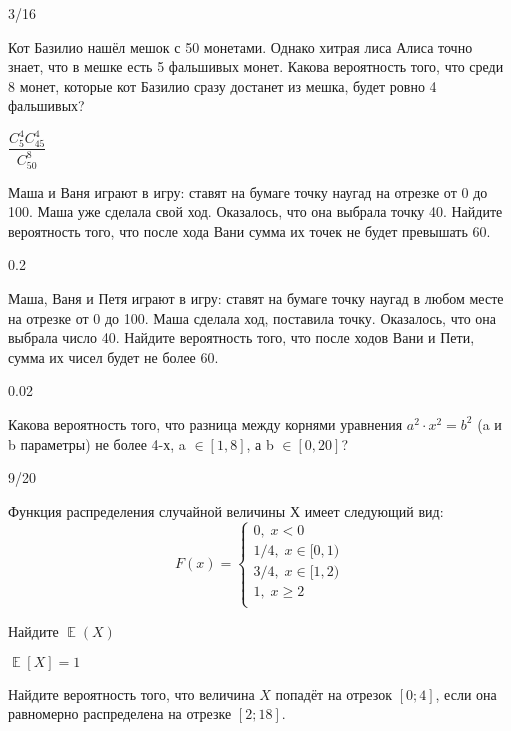 \documentclass[12pt, addpoints, answers]{exam} %
\DeclareMathOperator{\E}{\mathbb{E}}
\begin{document}
\begin{questions}
\begin{solution}
 3/16
\end{solution}

\question Кот Базилио нашёл мешок с 50 монетами. Однако хитрая лиса Алиса точно знает, что в мешке есть 5 фальшивых монет. Какова вероятность того, что среди 8 монет, которые кот Базилио сразу достанет из мешка, будет ровно 4 фальшивых?


\begin{solution}
 $ \dfrac{C_{5}^4C_{45}^4}{C_{50}^8}$
\end{solution}

\question Маша и Ваня играют в игру: ставят на бумаге точку наугад на отрезке от 0 до 100. Маша уже сделала свой ход. Оказалось, что она выбрала точку 40. Найдите вероятность того, что после хода Вани сумма их точек не будет превышать 60.


\begin{solution}
 0.2
\end{solution}

\question Маша, Ваня и Петя играют в игру: ставят на бумаге точку наугад в любом месте на отрезке от 0 до 100. Маша сделала ход, поставила точку. Оказалось, что она выбрала число 40. Найдите вероятность того, что после ходов Вани и Пети, сумма их чисел будет не более 60.

\begin{solution}
 0.02
\end{solution}

\question Какова вероятность того, что разница между корнями уравнения $ a^{2}\cdot x^{2}=b^{2} $ (a и b параметры) не более 4-х, a $\in [1,8] $, а b $\in [0,20] $?

\begin{solution}
 9/20
\end{solution}

\question Функция распределения случайной величины Х имеет следующий вид:
\[
F(x)=\begin{cases}
0, \; x<0 \\
1/4, \; x \in [0,1)\\
3/4, \; x \in [1,2)\\
1, \; x \geq 2\\
\end{cases}
\]

Найдите $\E(X)$

\begin{solution}
$\E[X]=1$
\end{solution}

\question Найдите вероятность того, что величина $X$ попадёт на отрезок $[0;4]$, если она равномерно распределена на отрезке $[2;18]$.



\end{questions}
\end{document}
